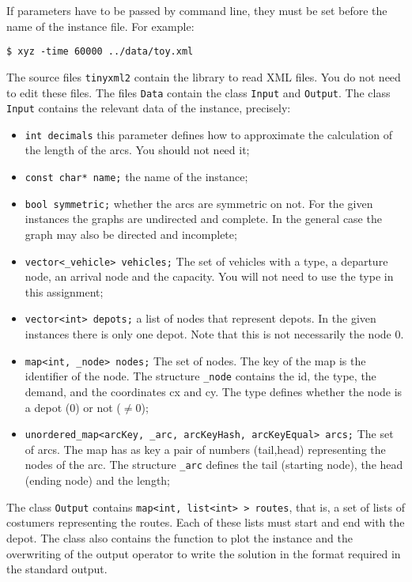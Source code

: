 \color{blue}
If parameters have to be passed by command line, they must be set before
the name of the instance file. For example:
\begin{verbatim}
$ xyz -time 60000 ../data/toy.xml 
\end{verbatim}
\color{black}


\bigskip
The source files \texttt{tinyxml2} contain the library to read XML
files. You do not need to edit these files. The files \texttt{Data}
contain the class \texttt{Input} and \texttt{Output}.
The class  \texttt{Input} contains the relevant data of the instance, precisely:


\begin{itemize}
\item \verb=int decimals= this parameter defines how to approximate the
  calculation of the length of the arcs. You should not need it;
\item \verb=const char* name;= the name of the instance;
\item \verb=bool symmetric;= whether the arcs are symmetric on not. For
  the given instances the graphs are undirected and complete. In the
  general case the graph may also be directed and incomplete;
\item \verb=vector<_vehicle> vehicles;= The set of vehicles with a type,
  a departure node, an arrival node and the capacity. You will not need
  to use the type in this assignment;
\item \verb=vector<int> depots;= a list of nodes that represent
  depots. In the given instances there is only one depot. Note that this
  is not necessarily the node 0.
\item \verb=map<int, _node> nodes;= The set of nodes. The key of the map
  is the identifier of the node. The structure \verb=_node= contains the
  id, the type, the demand, and the coordinates cx and cy. The type
  defines whether the node is a depot ($0$) or not ($\neq 0$);
\item \verb=unordered_map<arcKey, _arc, arcKeyHash, arcKeyEqual> arcs;=
  The set of arcs. The map has as key a pair of numbers (tail,head)
  representing the nodes of the arc. The structure \verb=_arc= defines
  the tail (starting node), the head (ending node) and the length;
\end{itemize}

The class \texttt{Output} contains \verb=map<int, list<int> > routes=,
that is, a set of lists of costumers representing the routes. Each of
these lists must start and end with the depot. The class also contains
the function to plot the instance and the overwriting of the output
operator to write the solution in the format required in the standard
output.

